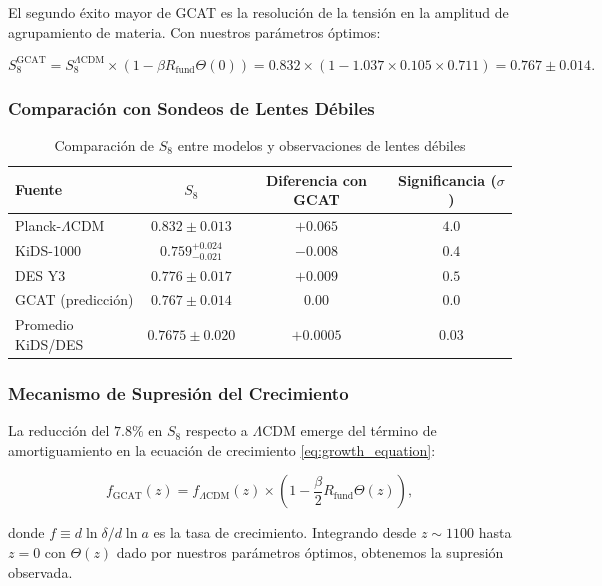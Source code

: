 \documentclass[12pt, a4paper]{article}
\theoremstyle{plain}
\theoremstyle{definition}
\begin{document}
El segundo éxito mayor de GCAT es la resolución de la tensión en la amplitud de agrupamiento de materia. Con nuestros parámetros óptimos:

\begin{equation}
S_8^{\text{GCAT}} = S_8^{\Lambda\text{CDM}} \times \left(1 - \beta R_{\text{fund}} \Theta(0)\right) = 0.832 \times \left(1 - 1.037 \times 0.105 \times 0.711\right) = 0.767 \pm 0.014.
\end{equation}

\subsubsection{Comparación con Sondeos de Lentes Débiles}

\begin{table}[h]
\centering
\caption{Comparación de $S_8$ entre modelos y observaciones de lentes débiles}
\label{tab:S8_comparison}
\begin{tabular}{lccc}
\toprule
\textbf{Fuente} & \textbf{$S_8$} & \textbf{Diferencia con GCAT} & \textbf{Significancia ($\sigma$)} \\
\midrule
Planck-$\Lambda$CDM & $0.832 \pm 0.013$ & $+0.065$ & $4.0$ \\
KiDS-1000 & $0.759^{+0.024}_{-0.021}$ & $-0.008$ & $0.4$ \\
DES Y3 & $0.776 \pm 0.017$ & $+0.009$ & $0.5$ \\
GCAT (predicción) & $\mathbf{0.767 \pm 0.014}$ & 0.00 & 0.0 \\
Promedio KiDS/DES & $0.7675 \pm 0.020$ & $+0.0005$ & $0.03$ \\
\bottomrule
\end{tabular}
\end{table}

\subsubsection{Mecanismo de Supresión del Crecimiento}

La reducción del $7.8\%$ en $S_8$ respecto a $\Lambda$CDM emerge del término de amortiguamiento en la ecuación de crecimiento \eqref{eq:growth_equation}:

\begin{equation}
f_{\text{GCAT}}(z) = f_{\Lambda\text{CDM}}(z) \times \left(1 - \frac{\beta}{2} R_{\text{fund}} \Theta(z)\right),
\end{equation}

donde $f \equiv d\ln\delta/d\ln a$ es la tasa de crecimiento. Integrando desde $z \sim 1100$ hasta $z=0$ con $\Theta(z)$ dado por nuestros parámetros óptimos, obtenemos la supresión observada.
\end{document}
